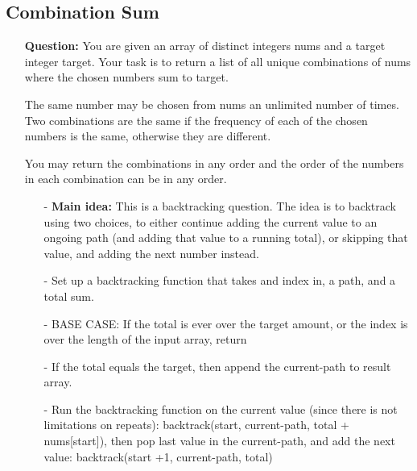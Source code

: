 \documentclass[12pt]{article}
\begin{document}
\subsection{Combination Sum}
\begin{enumerate}
  \item[] \textbf{Question:} You are given an array of distinct integers nums and a target integer target. Your task is to return a list of all unique combinations of nums where the chosen numbers sum to target.

The same number may be chosen from nums an unlimited number of times. Two combinations are the same if the frequency of each of the chosen numbers is the same, otherwise they are different.

You may return the combinations in any order and the order of the numbers in each combination can be in any order.


    \begin{enumerate}
      \item[-] \textbf{Main idea:} This is a backtracking question. The idea is to backtrack using two choices, to either continue adding the current value to an ongoing path (and adding that value to a running total), or skipping that value, and adding the next number instead.
      \item[-] Set up a backtracking function that takes and index in, a path, and a total sum. 
      \item[-] BASE CASE: If the total is ever over the target amount, or the index is over the length of the input array, return 
      \item[-] If the total equals the target, then append the current-path to result array.
      \item[-] Run the backtracking function on the current value (since there is not limitations on repeats):  backtrack(start, current-path, total + nums[start]), then pop last value in the current-path, and add the next value:             backtrack(start +1, current-path, total)

    \end{enumerate}
\end{enumerate}
\end{document}
